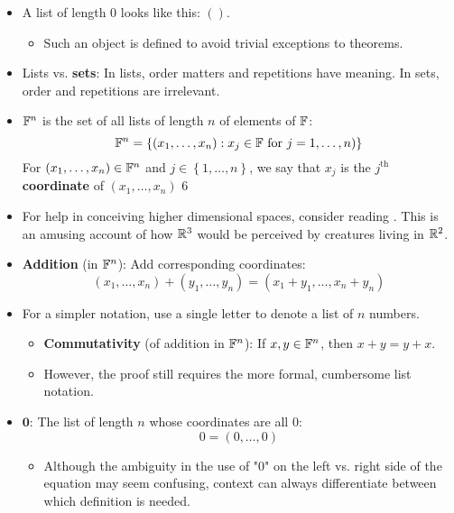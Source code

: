 \documentclass[../main.tex]{subfiles}
\begin{document}
\begin{itemize}
    \item A list of length 0 looks like this: $()$.
    \begin{itemize}
        \item Such an object is defined to avoid trivial exceptions to theorems.
    \end{itemize}
    \item Lists vs. \textbf{sets}: In lists, order matters and repetitions have meaning. In sets, order and repetitions are irrelevant.
    \item \dq
        {$\mathbb{F}^n$ is the set of all lists of length $n$ of elements of $\mathbb{F}$:
        \begin{equation*}
            \mathbb{F}^n = \left\{ (x_1,\dots,x_n):x_j\in\mathbb{F}\text{ for }j=1,\dots,n)\right\}
        \end{equation*}
        For $(x_1,\dots,x_n)\in\mathbb{F}^n$ and $j\in\left\{ 1,\dots,n \right\}$, we say that $x_j$ is the $j^\text{th}$ \textbf{coordinate} of $(x_1,\dots,x_n)$}
    {6}
    \item For help in conceiving higher dimensional spaces, consider reading \textcite{bib:Abbott}. This is an amusing account of how $\mathbb{R}^3$ would be perceived by creatures living in $\mathbb{R}^2$.
    \item \textbf{Addition} (in $\mathbb{F}^n$): Add corresponding coordinates:
    \begin{equation*}
        (x_1,\dots,x_n)+(y_1,\dots,y_n)=(x_1+y_1,\dots,x_n+y_n)
    \end{equation*}
    \item For a simpler notation, use a single letter to denote a list of $n$ numbers.
    \begin{itemize}
        \item \textbf{Commutativity} (of addition in $\mathbb{F}^n$): If $x,y\in\mathbb{F}^n$, then $x+y=y+x$.
        \item However, the proof still requires the more formal, cumbersome list notation.
    \end{itemize}
    \item $\mathbf{0}$: The list of length $n$ whose coordinates are all 0:
    \begin{equation*}
        0=(0,\dots,0)
    \end{equation*}
    \begin{itemize}
        \item Although the ambiguity in the use of "0" on the left vs. right side of the equation may seem confusing, context can always differentiate between which definition is needed.

\end{itemize}
\end{itemize}
\end{document}
